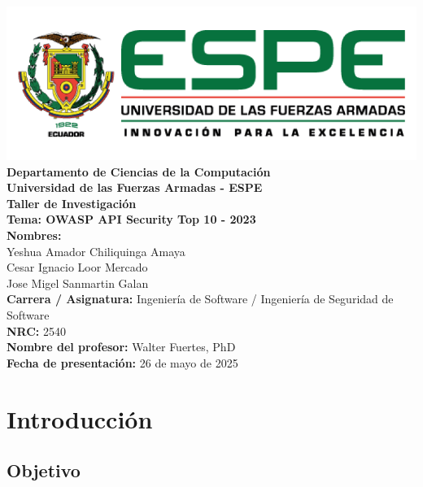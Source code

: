 \documentclass[a4paper,12pt]{article}
\begin{document}
\begin{titlepage}
    \centering
    \vspace*{1cm}
    \includegraphics[width=0.8\linewidth]{espe.png}\\[0.5cm]
    
    \Large \textbf{Departamento de Ciencias de la Computación}\\
    \large \textbf{Universidad de las Fuerzas Armadas - ESPE}\\[0.5cm]
    
    \Huge \textbf{Taller de Investigación}\\[0.3cm]
    \Large \textbf{Tema: OWASP API Security Top 10 - 2023}\\[0.8cm]
    
    \textbf{Nombres:}\\
    Yeshua Amador Chiliquinga Amaya\\
    Cesar Ignacio Loor Mercado\\
    Jose Migel Sanmartin Galan\\[0.3cm]
    
    \textbf{Carrera / Asignatura:} Ingeniería de Software / Ingeniería de Seguridad de Software\\
    \textbf{NRC:} 2540\\
    \textbf{Nombre del profesor:} Walter Fuertes, PhD\\[0.5cm]
    
    \textbf{Fecha de presentación:} 26 de mayo de 2025\\[1cm]
    
    \vfill
\end{titlepage}
\tableofcontents
\newpage

\section{Introducción}

\subsection{Objetivo}
\end{document}
